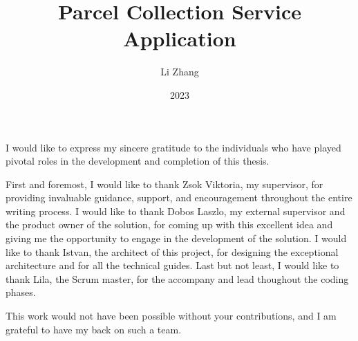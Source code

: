 \documentclass[
]{elteikthesis}[2023/04/10]
\title{Parcel Collection Service Application } %
\date{2023} %
\author{Li Zhang}
\affiliation{Assistant Professor} %
\begin{document}


\maketitle
%

\tableofcontents
\cleardoublepage


\cleardoublepage


\cleardoublepage


\cleardoublepage


\cleardoublepage

\chapter*{\acklabel}
I would like to express my sincere gratitude to the individuals who have played pivotal roles in the development and completion of this thesis.

First and foremost, I would like to thank Zsok Viktoria, my supervisor, for providing invaluable guidance, support, and encouragement throughout the entire writing process. 
I would like to thank Dobos Laszlo, my external supervisor and the product owner of the solution, for coming up with this excellent idea and giving me the opportunity to engage in the development of the solution.
I would like to thank Istvan, the architect of this project, for designing the exceptional architecture and for all the technical guides.
Last but not least, I would like to thank Lila, the Scrum master, for the accompany and lead thoughout the coding phases.

This work would not have been possible without your contributions, and I am grateful to have my back on such a team.

% 
\end{document}
